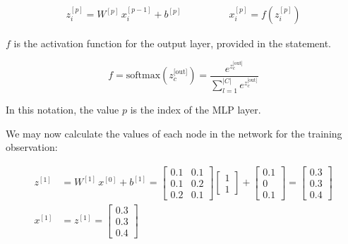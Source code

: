 \documentclass[12pt]{article}
\begin{document}
\begin{enumerate}
\begin{align*}
z^{[p]}_i = W^{[p]} \, x^{[p-1]}_i + b^{[p]} & \qquad\qquad
x^{[p]}_i = f\left(z^{[p]}_i\right)
\end{align*}

$f$ is the activation function for the output layer, provided in the statement.

\begin{equation*}
    f = \text{softmax}(z_c^\text{[out]}) = \frac{e^{z_c^\text{[out]}}}{\sum_{l=1}^{|C|} e^{z_c^\text{[out]}}}
\end{equation*}

\vspace{10pt}
In this notation, the value $p$ is the index of the MLP layer.

\vspace{20pt}
We may now calculate the values of each node in the network for the training observation:

\vspace{10pt}
\begin{equation*}
    \begin{aligned}
        z^{[1]} &= W^{[1]} \, x^{[0]} + b^{[1]} = \begin{bmatrix}
            0.1 & 0.1 \\
            0.1 & 0.2 \\
            0.2 & 0.1
        \end{bmatrix} \begin{bmatrix}
            1 \\
            1
        \end{bmatrix} + \begin{bmatrix}
            0.1 \\
            0 \\
            0.1
        \end{bmatrix} = \begin{bmatrix}
            0.3 \\
            0.3 \\
            0.4
        \end{bmatrix} \\
        x^{[1]} &= z^{[1]} = \begin{bmatrix}
            0.3 \\
            0.3 \\
            0.4
        \end{bmatrix}
    \end{aligned}
\end{equation*}


\end{enumerate}
\end{document}
